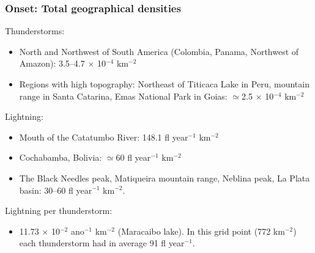 \documentclass[smaller]{beamer}
\begin{document}
\begin{frame}
\frametitle{Onset: Total geographical densities}
Thunderstorms:
\begin{itemize}
\item North and Northwest of South America (Colombia, Panama, Northwest of Amazon): 3.5--4.7 $\times$ 10$^{-4}$ km$^{-2}$
\item Regions with high topography: Northeast of Titicaca Lake in Peru, mountain range in Santa Catarina, Emas National Park in Goias: $\simeq$2.5 $\times$ 10$^{-4}$ km$^{-2}$
\end{itemize}
Lightning:
\begin{itemize}
\item Mouth of the Catatumbo River: 148.1 fl year$^{-1}$ km$^{-2}$ 
\item Cochabamba, Bolivia: $\simeq$60 fl year$^{-1}$ km$^{-2}$
\item The Black Needles peak, Matiqueira mountain range, Neblina peak, La Plata basin: 30--60 fl year$^{-1}$ km$^{-2}$.  
\end{itemize}
Lightning per thunderstorm:
\begin{itemize}
\item 11.73 $\times$ 10$^{-2}$ ano$^{-1}$ km$^{-2}$ (Maracaibo lake). In this grid point (772 km$^{-2}$) each thunderstorm had in average 91 fl year$^{-1}$.  
\end{itemize}

\end{frame}

\end{document}
